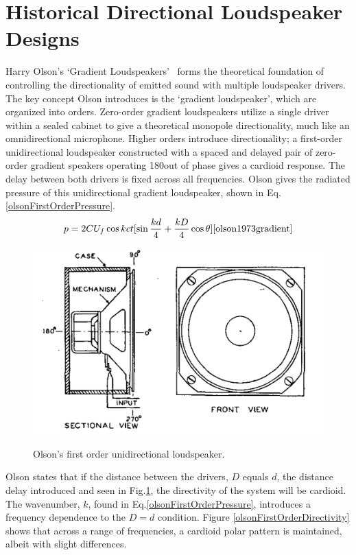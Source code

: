 \documentclass{report}
\begin{document}
    \section{Historical Directional Loudspeaker Designs}

        Harry Olson's `Gradient Loudspeakers'~\cite{olson1973gradient} forms the theoretical foundation of controlling the directionality of emitted sound with multiple loudspeaker drivers.
        The key concept Olson introduces is the `gradient loudspeaker', which are organized into orders.
        Zero-order gradient loudspeakers utilize a single driver within a sealed cabinet to give a theoretical monopole directionality, much like an omnidirectional microphone.
        Higher orders introduce directionality; a first-order unidirectional loudspeaker constructed with a spaced and delayed pair of zero-order gradient speakers operating 180\degree\@ out of phase gives a cardioid response.
        The delay between both drivers is fixed across all frequencies.
        Olson gives the radiated pressure of this unidirectional gradient loudspeaker, shown in Eq.\ref{olsonFirstOrderPressure}.
        \begin{equation}
            p = 2CU_f\cos{kct}[\sin{\frac{kd}{4}+\frac{kD}{4}\cos{\theta}}]
            \label{olsonFirstOrderPressure}
            \cite{olson1973gradient}
        \end{equation}
        \begin{figure}[H]
            \centering
            \includegraphics[scale=0.4]{figs/olsonFirstOrder.png}%
            \caption{Olson's first order unidirectional loudspeaker.}\cite{olson1973gradient}
            \label{olsonFirstOrderDiagram}
        \end{figure}
        Olson states that if the distance between the drivers, $D$ equals $d$, the distance delay introduced and seen in Fig.\ref{olsonFirstOrderDiagram}, the directivity of the system will be cardioid.
        The wavenumber, $k$, found in Eq.\ref{olsonFirstOrderPressure}, introduces a frequency dependence to the $D=d$ condition.
        Figure \ref{olsonFirstOrderDirectivity} shows that across a range of frequencies, a cardioid polar pattern is maintained, albeit with slight differences.
\end{document}
